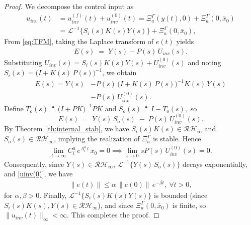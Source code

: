 \documentclass[journal]{IEEEtran}
\theoremstyle{remark}
\begin{document}
\begin{proof}
We decompose the control input as
\begin{align}
u_{inv}(t) &= u_{inv}^{(f)}(t) + u_{inv}^{(0)}(t) = \Xi_a^\Gamma(y(t),0) + \Xi_a^\Gamma(0,\bar{x}_0) \nonumber \\&=\mathscr{L}^{-1}\{S_i(s)K(s)Y(s)\}+\Xi_a^\Gamma(0,\bar{x}_0),
\end{align}
From \eqref{eq:TFM}, taking the Laplace transform of \(e(t)\) yields
\begin{align}\label{EinS}
E(s) \;=\; Y(s) - P(s)\,U_{inv}(s).
\end{align}
Substituting
\(
U_{inv}(s) = S_i(s)K(s)Y(s) + U_{inv}^{(0)}(s)
\)
and noting \(S_i(s) = \bigl(I + K(s)\,P(s)\bigr)^{-1}\), we obtain
\begin{align*}
E(s) = Y(s) &- P(s)\,\bigl(I + K(s)\,P(s)\bigr)^{-1}K(s)\,Y(s)
\\&-P(s)\,U_{inv}^{(0)}(s).
\end{align*}
Define 
\(
T_o(s) \triangleq \bigl(I + PK\bigr)^{-1}PK
\)
and 
\(
S_o(s) \triangleq I - T_o(s),
\)
so 
\[
E(s) \;=\; Y(s)\,S_o(s) \;-\; P(s)\,U_{inv}^{(0)}(s).
\]
By Theorem~\ref{th:internal_stab}, we have \(S_i(s)K(s) \in \mathcal{RH}_\infty\) and \(S_o(s)\in\mathcal{RH}_\infty\), implying the realization of \(\Xi_a^\Gamma\) is stable. Hence 
\begin{align} \label{uinv(0)}
\lim_{t\to\infty} C_i^a\,e^{A_i^a\,t}\,\bar{x}_0 = 0 \implies \lim_{s\to0}sP(s)\,U_{inv}^{(0)}(s) =0. 
\end{align}
Consequently, since $Y(s)\in \mathcal{RH}_\infty$, \(\mathscr{L}^{-1}\{Y(s)\,S_o(s)\}\) decays exponentially, and \eqref{uinv(0)}, we have 
\begin{align*}
\|e(t)\| \le \alpha\,\|e(0)\|\,e^{-\beta t},\ \forall t>0,
\end{align*}
for \(\alpha,\beta>0\). Finally, \(\mathscr{L}^{-1}\{S_i(s)K(s)Y(s)\}\) is bounded (since \(S_i(s)K(s), Y(s)\in\mathcal{RH}_\infty\)), and since \(\Xi_a^\Gamma(0,\bar{x}_0)\) is finite, so \(\|u_{inv}(t)\|_\infty<\infty\). This completes the proof.
\end{proof}
\end{document}
